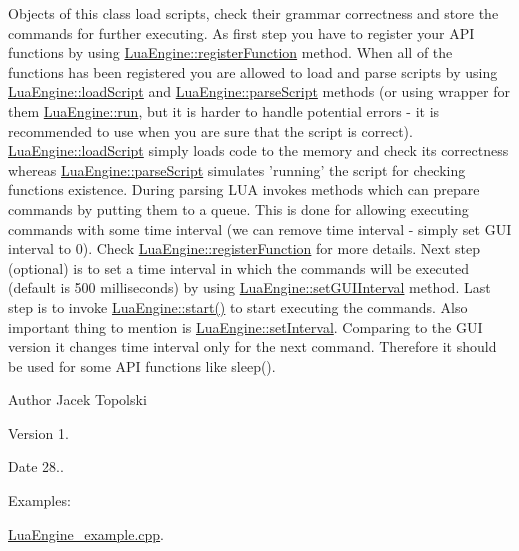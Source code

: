 Objects of this class load scripts, check their grammar correctness and store the commands for further executing. As first step you have to register your A\-P\-I functions by using \hyperlink{class_lua_engine_a03530362918aceccd6f69a5cecf2a968}{Lua\-Engine\-::register\-Function} method. When all of the functions has been registered you are allowed to load and parse scripts by using \hyperlink{class_lua_engine_aab9337ae5ea59bccc1e08c4015d42700}{Lua\-Engine\-::load\-Script} and \hyperlink{class_lua_engine_a5eae05f78704166f098ea20568c23fd7}{Lua\-Engine\-::parse\-Script} methods (or using wrapper for them \hyperlink{class_lua_engine_a38430b2be86fac999acd740423ec1fc8}{Lua\-Engine\-::run}, but it is harder to handle potential errors -\/ it is recommended to use when you are sure that the script is correct). \hyperlink{class_lua_engine_aab9337ae5ea59bccc1e08c4015d42700}{Lua\-Engine\-::load\-Script} simply loads code to the memory and check its correctness whereas \hyperlink{class_lua_engine_a5eae05f78704166f098ea20568c23fd7}{Lua\-Engine\-::parse\-Script} simulates 'running' the script for checking functions existence. During parsing L\-U\-A invokes methods which can prepare commands by putting them to a queue. This is done for allowing executing commands with some time interval (we can remove time interval -\/ simply set G\-U\-I interval to 0). Check \hyperlink{class_lua_engine_a03530362918aceccd6f69a5cecf2a968}{Lua\-Engine\-::register\-Function} for more details. Next step (optional) is to set a time interval in which the commands will be executed (default is 500 milliseconds) by using \hyperlink{class_lua_engine_ac29f2b09b45797aac68bd5caa6fe2c90}{Lua\-Engine\-::set\-G\-U\-I\-Interval} method. Last step is to invoke \hyperlink{class_lua_engine_a28e0795b54170d763a929256566fe2b5}{Lua\-Engine\-::start()} to start executing the commands. Also important thing to mention is \hyperlink{class_lua_engine_a0b87a8b474070665af6e435a2c5bce56}{Lua\-Engine\-::set\-Interval}. Comparing to the G\-U\-I version it changes time interval only for the next command. Therefore it should be used for some A\-P\-I functions like sleep(). \begin{DoxyAuthor}{Author}
Jacek Topolski 
\end{DoxyAuthor}
\begin{DoxyVersion}{Version}
1. 
\end{DoxyVersion}
\begin{DoxyDate}{Date}
28.. 
\end{DoxyDate}
\begin{Desc}
\item[Examples\-: ]\par
\hyperlink{_lua_engine_example_8cpp-example}{Lua\-Engine\-\_\-example.\-cpp}.\end{Desc}


